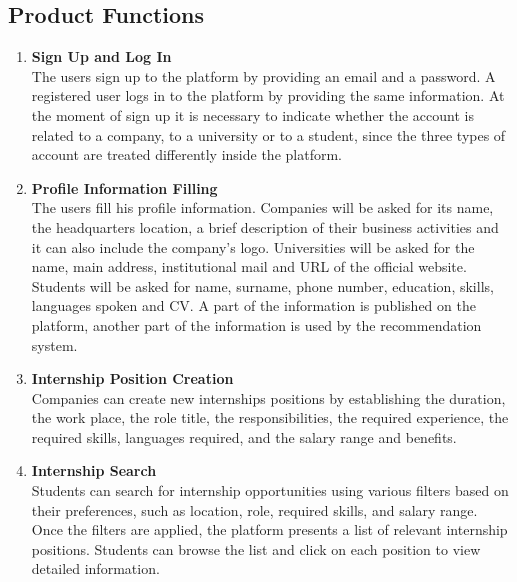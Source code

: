 
\subsection{Product Functions}
    \begin{enumerate}
        \item \textbf {Sign Up and Log In}             
        \\ The users sign up to the platform by providing an email and a password. A registered user logs in to the platform by providing the same information. At the moment of sign up it is necessary to indicate whether the account is related to a company, to a university or to a student, since the three types of account are treated differently inside the platform.
        
        \newpage
        \item \textbf {Profile Information Filling}   
        \\ The users fill his profile information. Companies will be asked for its name, the headquarters location,  a brief description of their business activities and it can also include the company's logo. Universities will be asked for the name, main address, institutional mail and URL of the official website. Students will be asked for name, surname, phone number, education, skills, languages spoken and CV. A part of the information is published on the platform, another part of the information is used by the recommendation system.
        
        \item \textbf {Internship Position Creation}
        \\ Companies can create new internships positions by establishing the duration, the work place, the role title, the responsibilities, the required experience, the required skills, languages required, and the salary range and benefits.

        \item \textbf{Internship Search}
        \\ Students can search for internship opportunities using various filters based on their preferences, such as location, role, required skills, and salary range. Once the filters are applied, the platform presents a list of relevant internship positions. Students can browse the list and click on each position to view detailed information.


\end{enumerate}
